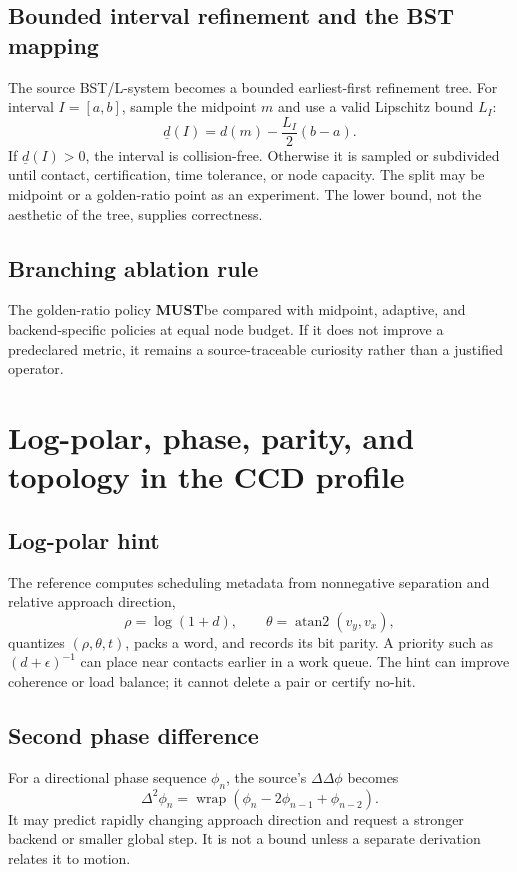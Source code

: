 \documentclass[11pt,a4paper,openany]{book}
\newcommand{\must}{\textbf{MUST}}
\begin{document}
\section{Bounded interval refinement and the BST mapping}
The source BST/L-system becomes a bounded earliest-first refinement tree. For interval $I=[a,b]$, sample the midpoint $m$ and use a valid Lipschitz bound $L_I$:
\begin{equation}
 \underline d(I)=d(m)-\frac{L_I}{2}(b-a).
\end{equation}
If $\underline d(I)>0$, the interval is collision-free. Otherwise it is sampled or subdivided until contact, certification, time tolerance, or node capacity. The split may be midpoint or a golden-ratio point as an experiment. The lower bound, not the aesthetic of the tree, supplies correctness.

\section{Branching ablation rule}
The golden-ratio policy \must be compared with midpoint, adaptive, and backend-specific policies at equal node budget. If it does not improve a predeclared metric, it remains a source-traceable curiosity rather than a justified operator.

\chapter{Log-polar, phase, parity, and topology in the CCD profile}
\section{Log-polar hint}
The reference computes scheduling metadata from nonnegative separation and relative approach direction,
\begin{equation}
 \rho=\log(1+d),\qquad \theta=\operatorname{atan2}(v_y,v_x),
\end{equation}
quantizes $(\rho,\theta,t)$, packs a word, and records its bit parity. A priority such as $(d+\epsilon)^{-1}$ can place near contacts earlier in a work queue. The hint can improve coherence or load balance; it cannot delete a pair or certify no-hit.

\section{Second phase difference}
For a directional phase sequence $\phi_n$, the source's $\Delta\Delta\phi$ becomes
\begin{equation}
 \Delta^2\phi_n=\operatorname{wrap}(\phi_n-2\phi_{n-1}+\phi_{n-2}).
\end{equation}
It may predict rapidly changing approach direction and request a stronger backend or smaller global step. It is not a bound unless a separate derivation relates it to motion.
\end{document}
